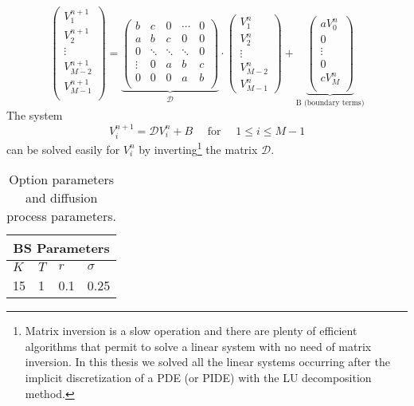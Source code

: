 $$
\left(
\begin{array}{c}
V^{n+1}_{1} \\
V^{n+1}_{2} \\
\vdots \\
V^{n+1}_{M-2} \\
V^{n+1}_{M-1} \\
\end{array}
\right) = 
\underbrace{
\left(
\begin{array}{ccccc}
b     & c  & 0 & \cdots  & 0 \\
a     & b  & c & 0  & 0  \\
0      & \ddots & \ddots &   \ddots     & 0  \\
\vdots & 0 & a & b  & c  \\
0      & 0 & 0 & a  & b \\
\end{array}
\right) }_{\mathcal{D}} \cdot
\left(
\begin{array}{c}
V^{n}_{1} \\
V^{n}_{2} \\
\vdots \\
V^{n}_{M-2} \\
V^{n}_{M-1} 
\end{array}
\right)
+ \underbrace{
\left(
\begin{array}{c}
 a V^{n}_{0} \\
  0 \\
 \vdots \\
 0 \\
c V^{n}_{M} \\
\end{array}
\right) }_{\mbox{B (boundary terms)}}
$$
The system 
$$ V^{n+1}_{i} = \mathcal{D} V^{n}_{i} + B \quad \mbox{ for } \quad 1 \leq i \leq M-1$$
can be solved easily for $V^{n}_{i}$ by inverting\footnote{ 
Matrix inversion is a slow operation and there are plenty of efficient algorithms that permit to solve a linear system with no need of matrix inversion.
In this thesis we solved all the linear systems occurring after the implicit discretization of a PDE (or PIDE) with the LU decomposition method.}
the matrix $\mathcal{D}$.
\begin{table}[!h]
\centering
{\begin{tabular}{llll}
\toprule
 \multicolumn{4}{c}{BS Parameters} \\
\midrule
$K$ & $T$ & $r$ & $\sigma$ \\
15 & 1 & 0.1 & 0.25 \\
\bottomrule
\end{tabular}}
\caption{Option parameters and diffusion process parameters.}
\label{tab:BS}		
\end{table}

